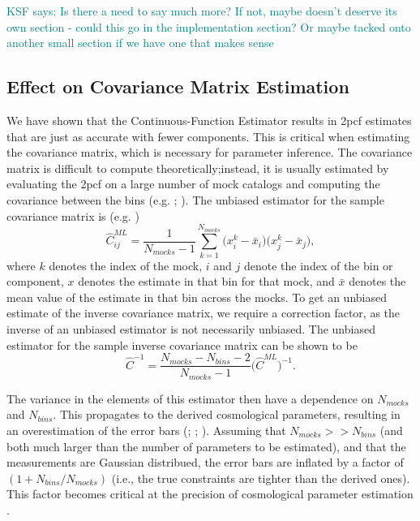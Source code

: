\documentclass[modern]{aastex62}
\newcommand{\cf}{2pcf\xspace} %
\newcommand{\est}{the Continuous-Function Estimator\xspace}
\newcommand{\inv}{^{-1}}
\newcommand{\KSF}[1]{\textcolor{teal}{KSF says: #1}}
\begin{document}
\KSF{Is there a need to say much more? If not, maybe doesn't deserve its own section - could this go in the implementation section? Or maybe tacked onto another small section if we have one that makes sense}

\subsection{Effect on Covariance Matrix Estimation}

We have shown that \est results in \cf estimates that are just as accurate with fewer components.
This is critical when estimating the covariance matrix, which is necessary for parameter inference.
The covariance matrix is difficult to compute theoretically;instead, it is usually estimated by evaluating the \cf on a large number of mock catalogs and computing the covariance between the bins (e.g. \citealt{Reid2010}; \citealt{Anderson2014}).
The unbiased estimator for the sample covariance matrix is (e.g. \citealt{Anderson2003})
\begin{equation}
\hat{C}^{ML}_{ij} = \frac{1}{N_{mocks}-1} \sum_{k=1}^{N_{mocks}} \bigg( x^k_i - \bar{x}_i \bigg) \bigg( x^k_j - \bar{x}_j \bigg),
\end{equation}
where $k$ denotes the index of the mock, $i$ and $j$ denote the index of the bin or component, $x$ denotes the estimate in that bin for that mock, and $\bar{x}$ denotes the mean value of the estimate in that bin across the mocks.
To get an unbiased estimate of the inverse covariance matrix, we require a correction factor, as the inverse of an unbiased estimator is not necessarily unbiased.
The unbiased estimator for the sample inverse covariance matrix can be shown to be \citep{Hartlap2007}
\begin{equation}
\hat{C}\inv = \frac{N_{mocks}-N_{bins}-2}{N_{mocks}-1} \bigg( \hat{C}^{ML}\bigg) \inv.
\end{equation}

The variance in the elements of this estimator then have a dependence on $N_{mocks}$ and $N_{bins}$.
This propagates to the derived cosmological parameters, resulting in an overestimation of the error bars (\citealt{Hartlap2007}; \citealt{Dodelson2013} \citealt{Percival2014}; \citealt{TaylorJoachimi2014}).
Assuming that $N_{mocks} >> N_{bins}$ (and both much larger than the number of parameters to be estimated), and that the measurements are Gaussian distribued, the error bars are inflated by a factor of $(1 + N_{bins}/N_{mocks})$ (i.e., the true constraints are tighter than the derived ones).
This factor becomes critical at the precision of cosmological parameter estimation \citep{Percival2014}.
\end{document}
